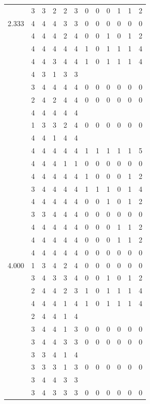 \documentclass[]{book}
\theoremstyle{definition}
\theoremstyle{definition}
\theoremstyle{definition}
\theoremstyle{remark}
\begin{document}
\begin{table}
{\begin{tabular}[t]{rrrrrrrrrrrr}
 & 3 & 3 & 2 & 2 & 3 & 0 & 0 & 0 & 1 & 1 & 2\\
2.333 & 4 & 4 & 4 & 3 & 3 & 0 & 0 & 0 & 0 & 0 & 0\\
 & 4 & 4 & 4 & 2 & 4 & 0 & 0 & 1 & 0 & 1 & 2\\
 & 4 & 4 & 4 & 4 & 4 & 1 & 0 & 1 & 1 & 1 & 4\\
 & 4 & 4 & 3 & 4 & 4 & 1 & 0 & 1 & 1 & 1 & 4\\
 & 4 & 3 & 1 & 3 & 3 &  &  &  &  &  & \\
 & 3 & 4 & 4 & 4 & 4 & 0 & 0 & 0 & 0 & 0 & 0\\
 & 2 & 4 & 2 & 4 & 4 & 0 & 0 & 0 & 0 & 0 & 0\\
 & 4 & 4 & 4 & 4 & 4 &  &  &  &  &  & \\
 & 1 & 3 & 3 & 2 & 4 & 0 & 0 & 0 & 0 & 0 & 0\\
 & 4 & 4 & 1 & 4 & 4 &  &  &  &  &  & \\
 & 4 & 4 & 4 & 4 & 4 & 1 & 1 & 1 & 1 & 1 & 5\\
 & 4 & 4 & 4 & 1 & 1 & 0 & 0 & 0 & 0 & 0 & 0\\
 & 4 & 4 & 4 & 4 & 4 & 1 & 0 & 0 & 0 & 1 & 2\\
 & 3 & 4 & 4 & 4 & 4 & 1 & 1 & 1 & 0 & 1 & 4\\
 & 4 & 4 & 4 & 4 & 4 & 0 & 0 & 1 & 0 & 1 & 2\\
 & 3 & 3 & 4 & 4 & 4 & 0 & 0 & 0 & 0 & 0 & 0\\
 & 4 & 4 & 4 & 4 & 4 & 0 & 0 & 0 & 1 & 1 & 2\\
 & 4 & 4 & 4 & 4 & 4 & 0 & 0 & 0 & 1 & 1 & 2\\
 & 4 & 4 & 4 & 4 & 4 & 0 & 0 & 0 & 0 & 0 & 0\\
4.000 & 1 & 3 & 4 & 2 & 4 & 0 & 0 & 0 & 0 & 0 & 0\\
 & 3 & 4 & 3 & 3 & 4 & 0 & 0 & 1 & 0 & 1 & 2\\
 & 2 & 4 & 4 & 2 & 3 & 1 & 0 & 1 & 1 & 1 & 4\\
 & 4 & 4 & 4 & 1 & 4 & 1 & 0 & 1 & 1 & 1 & 4\\
 & 2 & 4 & 4 & 1 & 4 &  &  &  &  &  & \\
 & 3 & 4 & 4 & 1 & 3 & 0 & 0 & 0 & 0 & 0 & 0\\
 & 3 & 4 & 4 & 3 & 3 & 0 & 0 & 0 & 0 & 0 & 0\\
 & 3 & 3 & 4 & 1 & 4 &  &  &  &  &  & \\
 & 3 & 3 & 3 & 1 & 3 & 0 & 0 & 0 & 0 & 0 & 0\\
 & 3 & 4 & 4 & 3 & 3 &  &  &  &  &  & \\
 & 3 & 4 & 3 & 3 & 3 & 0 & 0 & 0 & 0 & 0 & 0\\

\end{tabular}}
\end{table}
\end{document}
